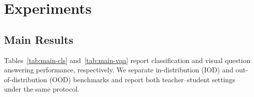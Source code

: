 \clearpage
\section{Experiments}
\label{sec:experiments}

\subsection{Main Results}

Tables~\ref{tab:main-cls} and~\ref{tab:main-vqa} report classification and
visual question answering performance, respectively. We separate
in-distribution (IOD) and out-of-distribution (OOD) benchmarks and report both
teacher--student settings under the same protocol.




\clearpage

